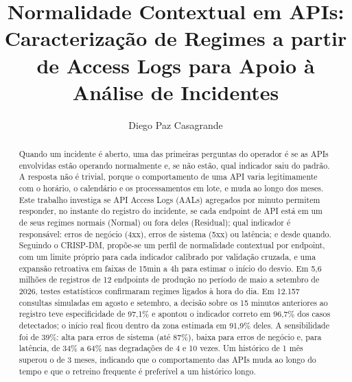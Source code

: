 \documentclass[sigconf,nonacm]{acmart}
\begin{document}
\title{Normalidade Contextual em APIs: Caracterização de Regimes a partir de Access Logs para Apoio à Análise de Incidentes}

\author{Diego Paz Casagrande}

\renewcommand{\shortauthors}{D. P. Casagrande}

\begin{abstract}
Quando um incidente é aberto, uma das primeiras perguntas do operador é se as APIs envolvidas estão operando normalmente e, se não estão, qual indicador saiu do padrão. A resposta não é trivial, porque o comportamento de uma API varia legitimamente com o horário, o calendário e os processamentos em lote, e muda ao longo dos meses. Este trabalho investiga se API Access Logs (AALs) agregados por minuto permitem responder, no instante do registro do incidente, se cada endpoint de API está em um de seus regimes normais (Normal) ou fora deles (Residual); qual indicador é responsável: erros de negócio (4xx), erros de sistema (5xx) ou latência; e desde quando. Seguindo o CRISP-DM, propõe-se um perfil de normalidade contextual por endpoint, com um limite próprio para cada indicador calibrado por validação cruzada, e uma expansão retroativa em faixas de 15min a 4h para estimar o início do desvio. Em 5,6 milhões de registros de 12 endpoints de produção no período de maio a setembro de 2026, testes estatísticos confirmaram regimes ligados à hora do dia. Em 12.157 consultas simuladas em agosto e setembro, a decisão sobre os 15 minutos anteriores ao registro teve especificidade de 97,1\% e apontou o indicador correto em 96,7\% dos casos detectados; o início real ficou dentro da zona estimada em 91,9\% deles. A sensibilidade foi de 39\%: alta para erros de sistema (até 87\%), baixa para erros de negócio e, para latência, de 34\% a 64\% nas degradações de 4 e 10 vezes. Um histórico de 1 mês superou o de 3 meses, indicando que o comportamento das APIs muda ao longo do tempo e que o retreino frequente é preferível a um histórico longo.
\end{abstract}


\maketitle
\end{document}
